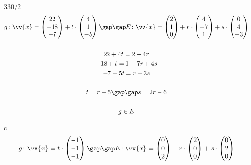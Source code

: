 \begin{exercise}{330/2}
\begin{gather*}
    g \colon \vv{x} = \begin{pmatrix}22 \\ -18 \\ -7\end{pmatrix} + t \cdot \begin{pmatrix}4 \\ 1 \\ -5\end{pmatrix} \gap\gap E \colon \vv{x} = \begin{pmatrix}2 \\ 1 \\ 0\end{pmatrix} + r \cdot \begin{pmatrix}4 \\ -7 \\ 1\end{pmatrix} + s \cdot \begin{pmatrix}0 \\ 4 \\ -3\end{pmatrix} \\\\
    22 + 4t = 2 + 4r \\
    -18 + t = 1 - 7r + 4s \\
    -7 - 5t = r - 3s \\\\
    t = r - 5 \gap\gap s = 2r - 6 \\\\
    g \in E
  \end{gather*}
  \item [c]
  \begin{gather*}
    g \colon \vv{x} = t \cdot \begin{pmatrix}-1 \\ -1 \\ -1\end{pmatrix} \gap\gap E \colon \vv{x} = \begin{pmatrix}0 \\ 0 \\ 2\end{pmatrix} + r \cdot \begin{pmatrix}2 \\ 0 \\ 0\end{pmatrix} + s \cdot \begin{pmatrix}0 \\ 2 \\ 0\end{pmatrix} \\\\

\end{gather*}
\end{exercise}
